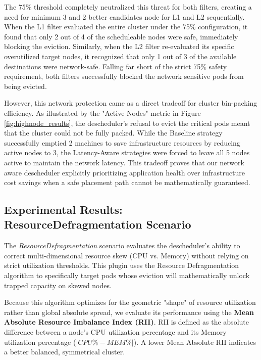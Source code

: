 The 75\% threshold completely neutralized this threat for both filters, creating a need for minimum 3 and 2 better candidates node for L1 and L2 sequentially. When the L1 filter evaluated the entire cluster under the 75\% configuration, it found that only 2 out of 4 of the scheduleable nodes were safe, immediately blocking the eviction. Similarly, when the L2 filter re-evaluated its specific overutilized target nodes, it recognized that only 1 out of 3 of the available destinations were network-safe. Falling far short of the strict 75\% safety requirement, both filters successfully blocked the network sensitive pods from being evicted.

However, this network protection came as a direct tradeoff for cluster bin-packing efficiency. As illustrated by the "Active Nodes" metric in Figure \ref{fig:highnode_results}, the descheduler's refusal to evict the critical pods meant that the cluster could not be fully packed. While the Baseline strategy successfully emptied 2 machines to save infrastructure resources by reducing active nodes to 3, the Latency-Aware strategies were forced to leave all 5 nodes active to maintain the network latency. This tradeoff proves that our network aware descheduler explicitly prioritizing application health over infrastructure cost savings when a safe placement path cannot be mathematically guaranteed.

\subsection{Experimental Results: ResourceDefragmentation Scenario}
\label{subsec:netaware4_resultanalysis3}
The \textit{ResourceDefragmentation} scenario evaluates the descheduler's ability to correct multi-dimensional resource skew (CPU vs. Memory) without relying on strict utilization thresholds. This plugin uses the Resource Defragmentation algorithm to specifically target pods whose eviction will mathematically unlock trapped capacity on skewed nodes. 

Because this algorithm optimizes for the geometric "shape" of resource utilization rather than global absolute spread, we evaluate its performance using the \textbf{Mean Absolute Resource Imbalance Index (RII)}. RII is defined as the absolute difference between a node's CPU utilization percentage and its Memory utilization percentage ($|CPU\% - MEM\%|$). A lower Mean Absolute RII indicates a better balanced, symmetrical cluster.

